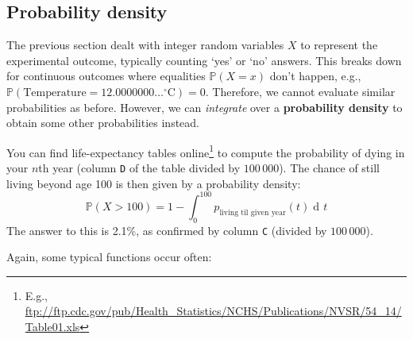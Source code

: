 \documentclass{article}
\DeclareMathOperator{\di}{d\!}
\begin{document}
\subsection{Probability density}
The previous section dealt with integer random variables $X$ to represent the experimental outcome, typically counting `yes' or `no' answers. This breaks down for continuous outcomes where equalities $\mathbb{P}(X=x)$ don't happen, e.g., $\mathbb{P}(\text{Temperature}=12.0000000\dots^\circ\!\text{C})=0$. Therefore, we cannot evaluate similar probabilities as before. However, we can \textit{integrate} over a \textbf{probability density} to obtain some other probabilities instead.
\begin{testexample}
    You can find life-expectancy tables online\footnote{E.g., \url{ftp://ftp.cdc.gov/pub/Health_Statistics/NCHS/Publications/NVSR/54_14/Table01.xls}} to compute the probability of dying in your $n$th year (column \texttt{D} of the table divided by $100\,000$). The chance of still living beyond age 100 is then given by a probability density:
    \begin{equation}
        \mathbb{P}(X> 100)=1 - \int_{0}^{100} p_\text{living til given year}(t)\di t
    \end{equation}
    The answer to this is 2.1\%, as confirmed by column \texttt{C} (divided by $100\,000$).
\end{testexample}\vspace{-0.3cm}
{\flushleft Again}, some typical functions occur often:
\end{document}
